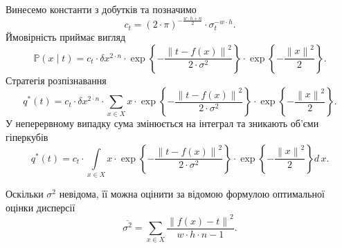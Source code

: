 Винесемо константи з добутків та позначимо
\begin{equation*}
  c_t = \left( 2 \cdot \pi \right)^{-\frac{w \cdot h + n}{2}}
    \cdot \sigma_t^{- w \cdot h}.
\end{equation*}
Ймовірність приймає вигляд
\begin{equation*}
  \mathbb{P}\left( x \mid t \right)
  = c_t \cdot \delta x^{2 \cdot n}
    \cdot \exp{\left\{ - \frac{\left\| t - f\left( x \right) \right\|^2}
                              {2 \cdot \sigma^2} \right\}}
    \cdot \exp{\left\{ - \frac{\left\| x \right\|^2}{2} \right\}}.
\end{equation*}
Стратегія розпізнавання
\begin{equation*}
  q^* \left( t \right)
  = c_t \cdot \delta x^{2 \cdot n}
    \cdot \sum_{x \in X}
      x
      \cdot \exp{\left\{ - \frac{\left\| t - f\left( x \right) \right\|^2}
                                {2 \cdot \sigma^2} \right\}}
    \cdot \exp{\left\{ - \frac{\left\| x \right\|^2}{2} \right\}}.
\end{equation*}
У неперервному випадку сума змінюється на інтеграл та зникають об'єми гіперкубів
\begin{equation*}
  q^* \left( t \right)
  = c_t
    \cdot \int\limits_{x \in X}
      x
      \cdot \exp{\left\{ - \frac{\left\| t - f\left( x \right) \right\|^2}
                                {2 \cdot \sigma^2} \right\}}
      \cdot \exp{\left\{ - \frac{\left\| x \right\|^2}{2} \right\}}
    d\,x.
\end{equation*}

Оскільки $\sigma^2$ невідома,
її можна оцінити за відомою формулою оптимальної оцінки дисперсії
\begin{equation*}
  \overline{\sigma^2}
  = \sum_{x \in X}
    \frac{\left\| f\left( x \right) - t \right\|^2}{w \cdot h \cdot n - 1}.
\end{equation*}
